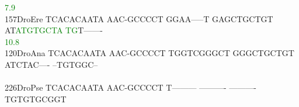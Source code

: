 \documentclass[11pt,twoside,reqno,a4paper]{article}
\begin{document}
{\hspace*{4\charwidth}\hspace*{7\charwidth}\hspace*{1\charwidth}\hspace*{1\charwidth}\hspace*{1\charwidth}\hspace*{1\charwidth}\hspace*{42\charwidth}\textcolor{Green}{7.9}\hspace*{1\charwidth}\hspace*{1\charwidth}\\
157\hspace*{1\charwidth}DroEre	TCACACAATA	AAC-GCCCCT	GGAA-----T	GAGCTGCTGT	AT\textcolor{Green}{A}\textcolor{Green}{T}\textcolor{Green}{G}\textcolor{Green}{T}\textcolor{Green}{G}\textcolor{Green}{C}\textcolor{Green}{T}\textcolor{Green}{A}	\textcolor{Green}{T}\textcolor{Green}{G}T-------	\\
\hspace*{4\charwidth}\hspace*{7\charwidth}\hspace*{1\charwidth}\hspace*{1\charwidth}\hspace*{1\charwidth}\hspace*{1\charwidth}\hspace*{42\charwidth}\textcolor{Green}{10.8}\hspace*{1\charwidth}\hspace*{1\charwidth}\\
120\hspace*{1\charwidth}DroAna	TCACACAATA	AAC-GCCCCT	TGGTCGGGCT	GGGCTGCTGT	ATCTAC----	--TGTGGC--	\\
\hspace*{4\charwidth}\hspace*{7\charwidth}\hspace*{1\charwidth}\hspace*{1\charwidth}\hspace*{1\charwidth}\hspace*{1\charwidth}\hspace*{1\charwidth}\hspace*{1\charwidth}\\
226\hspace*{1\charwidth}DroPse	TCACACAATA	AAC-GCCCCT	T---------	----------	----------	TGTGTGCGGT	\\
\hspace*{4\charwidth}\hspace*{7\charwidth}\hspace*{1\charwidth}\hspace*{1\charwidth}\hspace*{1\charwidth}\hspace*{1\charwidth}\hspace*{1\charwidth}\hspace*{1\charwidth}\\
}
\end{document}

